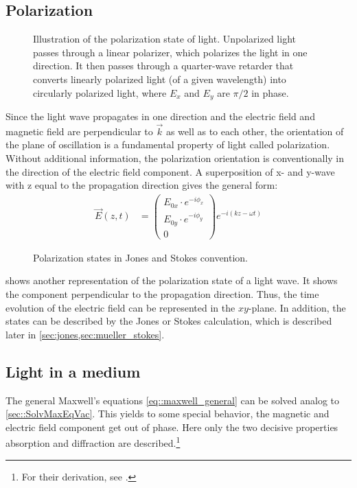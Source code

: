 \subsection{Polarization}
%
\begin{figure}[!t]
\centering
\setlength{\tikzwidth}{\textwidth}
\label{fig:polarization_state}
\caption{Illustration of the polarization state of light. Unpolarized light passes through a linear polarizer, which polarizes the light in one direction. It then passes through a quarter-wave retarder that converts linearly polarized light (of a given wavelength) into circularly polarized light, where $E_x$ and $E_y$ are $\pi/2$ in phase.}
\end{figure}
%
Since the light wave propagates in one direction and the electric field and magnetic field are perpendicular to $\vec{k}$ as well as to each other, the orientation of the plane of oscillation is a fundamental property of light called polarization.
Without additional information, the polarization orientation is conventionally in the direction of the electric field component.
%
A superposition of x- and y-wave with z equal to the propagation direction gives the general form:
\begin{align}
\vec{E}(z,t) &= \begin{pmatrix} E_{0x} \cdot e^{ -i \phi_x } \\ E_{0y} \cdot e^{ -i \phi_y } \\ 0 \end{pmatrix}
e^{ -i (kz - \omega t)}
\end{align}
%
\begin{figure}[!t]
\centering
\tikzset{external/export=false}

\caption{Polarization states in Jones and Stokes convention.}
\label{fig:polarization_state_vectors}
\end{figure}
%
 shows another representation of the polarization state of a light wave.
It shows the component perpendicular to the propagation direction.
Thus, the time evolution of the electric field can be represented in the $xy$-plane.
In addition, the states can be described by the Jones or Stokes calculation, which is described later in \cref{sec:jones,sec:mueller_stokes}.
%
%
%
\subsection{Light in a medium}
%
The general Maxwell's equations \cref{eq::maxwell_general} can be solved analog to \cref{sec::SolvMaxEqVac}. This yields to some special behavior, \eg{} the magnetic and electric field component get out of phase.
Here only the two decisive properties absorption and diffraction are described.\footnote{For their derivation, \eg{} see \cite{demtroeder2, Fliebach2012}.}
%
